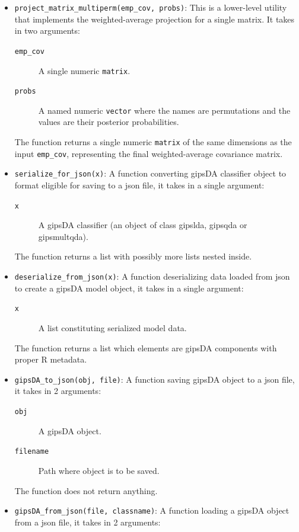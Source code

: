 \documentclass[a4paper,11pt,twoside]{report}
\theoremstyle{definition}
\begin{document}
\begin{itemize}
    \item \texttt{project\_matrix\_multiperm(emp\_cov, probs)}: This is a lower-level utility that implements the weighted-average projection for a single matrix. It takes in two arguments:
    \begin{description}
        \item[\texttt{emp\_cov}] A single numeric \texttt{matrix}.
        \item[\texttt{probs}] A named numeric \texttt{vector} where the names are permutations and the values are their posterior probabilities.
    \end{description}
    The function returns a single numeric \texttt{matrix} of the same dimensions as the input \texttt{emp\_cov}, representing the final weighted-average covariance matrix.
    \item \texttt{serialize\_for\_json(x)}: A function converting gipsDA classifier object to format eligible for saving to a json file, it takes in a single argument:
    \begin{description}
        \item[\texttt{x}] A gipsDA classifier (an object of class gipslda, gipsqda or gipsmultqda).
    \end{description}
    The function returns a list with possibly more lists nested inside.
    \item \texttt{deserialize\_from\_json(x)}: A function deserializing data loaded from json to create a gipsDA model object, it takes in a single argument:
    \begin{description}
        \item[\texttt{x}] A list constituting serialized model data.
    \end{description}
    The function returns a list which elements are gipsDA components with proper R metadata.
    \item \texttt{gipsDA\_to\_json(obj, file)}: A function saving gipsDA object to a json file, it takes in 2 arguments:
    \begin{description}
        \item[\texttt{obj}] A gipsDA object.
        \item[\texttt{filename}] Path where object is to be saved.
    \end{description}
    The function does not return anything.
    \item \texttt{gipsDA\_from\_json(file, classname)}: A function loading a gipsDA object from a json file, it takes in 2 arguments:
    \begin{description}

\end{description}
\end{itemize}
\end{document}
